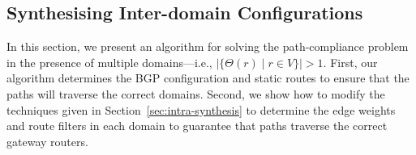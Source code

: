 \begin{figure}
	\centering
	\hfill
	\hfill
\end{figure}

\subsection{Synthesising Inter-domain Configurations}
\label{sec:inter-synthesis}


In this section, we present an algorithm for 
solving the path-compliance problem in the presence
of multiple domains---i.e., $|\{\Theta(r) \mid r\in V\}|>1$.
First, our algorithm determines the 
BGP configuration and static routes to ensure that the 
paths will traverse the correct domains.
Second, we show how to modify the 
techniques given in Section~\ref{sec:intra-synthesis}
to determine the edge weights and route filters
 in each domain to guarantee that paths traverse
the correct gateway routers.





